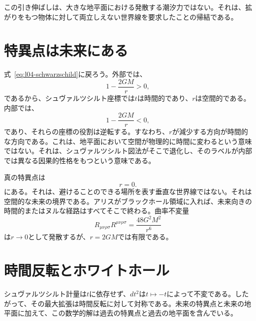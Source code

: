 この引き伸ばしは、大きな地平面における発散する潮汐力ではない。それは、拡がりをもつ物体に対して両立しえない世界線を要求したことの帰結である。

\section{特異点は未来にある}

式~\eqref{eq:l04-schwarzschild}に戻ろう。外部では、
\begin{equation}
1-\frac{2GM}{r}>0,
\end{equation}
であるから、シュヴァルツシルト座標では\(t\)は時間的であり、\(r\)は空間的である。内部では、
\begin{equation}
1-\frac{2GM}{r}<0,
\end{equation}
であり、それらの座標の役割は逆転する。すなわち、\(r\)が減少する方向が時間的な方向である。これは、地平面において空間が物理的に時間に変わるという意味ではない。それは、シュヴァルツシルト図法がそこで退化し、そのラベルが内部では異なる因果的性格をもつという意味である。

真の特異点は
\begin{equation}
r=0.
\end{equation}
にある。それは、避けることのできる場所を表す垂直な世界線ではない。それは空間的な未来の境界である。アリスがブラックホール領域に入れば、未来向きの時間的またはヌルな経路はすべてそこで終わる。曲率不変量
\begin{equation}
R_{\mu\nu\rho\sigma}R^{\mu\nu\rho\sigma}
=\frac{48G^2M^2}{r^6}
\label{eq:l04-kretschmann}
\end{equation}
は\(r\to0\)として発散するが、\(r=2GM\)では有限である。

\section{時間反転とホワイトホール}

シュヴァルツシルト計量は\(t\)に依存せず、\(dt^2\)は\(t\mapsto-t\)によって不変である。したがって、その最大拡張は時間反転に対して対称である。未来の特異点と未来の地平面に加えて、この数学的解は過去の特異点と過去の地平面を含んでいる。

